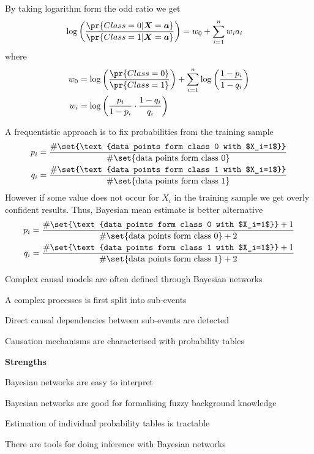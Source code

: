 \documentclass[landscape,footrule]{foils}
\begin{document}
 
By taking logarithm form the odd ratio we get
\begin{align*}
\log\left(\frac{\pr{Class=0|\vec{X}=\vec{a}}}{\pr{Class=1|\vec{X}=\vec{a}}}\right)&= w_0+\sum_{i=1}^n w_ia_i
\end{align*} 
where 
\begin{align*}
w_0&=\log\left(\frac{\pr{Class=0}}{\pr{Class=1}}\right)+\sum_{i=1}^n\log\left(\frac{1-p_i}{1-q_i}\right)\\
w_i&=\log \left(\frac{p_i}{1-p_i}\cdot\frac{1-q_i}{q_i}\right) 
\end{align*}

A frequentistic approach is to fix probabilities from the training sample
\begin{align*}
p_i&=\frac{\#\set{\text{data points form class 0 with $X_i=1$}}}{\#\set{\text{data points form class 0}}}\\
q_i&=\frac{\#\set{\text{data points form class 1 with $X_i=1$}}}{\#\set{\text{data points form class 1}}}
\end{align*}
However if some value does not occur for $X_i$ in the training sample we get overly confident results. Thus, Bayesian mean estimate is better alternative  
\begin{align*}
p_i&=\frac{\#\set{\text{data points form class 0 with $X_i=1$}}+1}{\#\set{\text{data points form class 0}}+2}\\
q_i&=\frac{\#\set{\text{data points form class 1 with $X_i=1$}}+1}{\#\set{\text{data points form class 1}}+2}
\end{align*}


Complex causal models are often defined through Bayesian networks
\begin{triangles}
\item A complex processes is first split into sub-events
\item Direct causal dependencies between sub-events are detected
\item Causation mechanisms are characterised with probability tables
\end{triangles} 
  

\textbf{Strengths}
\begin{triangles}
\item Bayesian networks are easy to interpret
\item Bayesian networks are good for formalising fuzzy background knowledge
\item Estimation of individual probability tables is tractable
\item There are tools for doing inference with Bayesian networks  
\end{triangles}
\vspace*{1cm}
\end{document}
